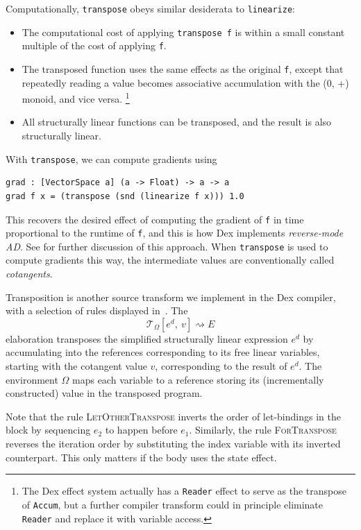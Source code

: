 \documentclass[acmsmall,screen,nonacm]{acmart}
\newlength{\codeindent}
\newcommand{\ttt}[1]{\texttt{#1}}
\newcommand{\tsc}[1]{\textsc{#1}}
\newcommand{\transruleop}[3]{\mathcal{T}_{#1}[#2,~#3] }
\newcommand{\transrule}[3]{\transruleop{#1}{#2}{#3} \rightsquigarrow }
\newcommand{\transenv}{\Omega}
\begin{document}
Computationally, \texttt{transpose} obeys similar desiderata to \texttt{linearize}:
\begin{itemize}
\item The computational cost of applying \texttt{transpose f} is within a small constant multiple of the cost of applying \texttt{f}.
\item The transposed function uses the same effects as the original \texttt{f}, except that repeatedly reading a value becomes associative accumulation with the (0, +) monoid, and vice versa.%
\footnote{The Dex effect system actually has a \texttt{Reader} effect to serve as the transpose of \texttt{Accum}, but a further compiler transform could in principle eliminate \texttt{Reader} and replace it with variable access.}
\item All structurally linear functions can be transposed, and the result is also structurally linear.
\end{itemize}

With \texttt{transpose}, we can compute gradients using
\begin{Verbatim}[xleftmargin=\codeindent,fontsize=\small]
grad : [VectorSpace a] (a -> Float) -> a -> a
grad f x = (transpose (snd (linearize f x))) 1.0
\end{Verbatim}
This recovers the desired effect of computing the gradient of \texttt{f} in time proportional to the runtime of \texttt{f}, and this is how Dex implements \emph{reverse-mode AD}.
See \citet{frostig2021decomposing} for further discussion of this approach.
When \ttt{transpose} is used to compute gradients this way, the intermediate values are conventionally called \emph{cotangents}.

Transposition is another source transform we implement in the Dex compiler, with a selection of rules displayed in~.
The
$$\transrule{\transenv}{e^d}{v} E$$
elaboration transposes the simplified structurally linear expression $e^d$ by accumulating into the references corresponding to its free linear variables,
starting with the cotangent value $v$, corresponding to the result of $e^d$. The environment $\transenv$ maps each variable to a reference
storing its (incrementally constructed) value in the transposed program.

Note that the rule \tsc{LetOtherTranspose} inverts the order of let-bindings in the block by sequencing $e_2$ to happen before $e_1$.
Similarly, the rule \tsc{ForTranspose} reverses the iteration order by substituting the index variable with its inverted counterpart.
This only matters if the body uses the state effect.
\end{document}
